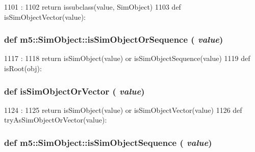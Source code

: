 \begin{DoxyCode}
1101                            :
1102     return issubclass(value, SimObject)
1103 
def isSimObjectVector(value):
\end{DoxyCode}
\hypertarget{namespacem5_1_1SimObject_a9bb31e7752bd7ccec0041220fb4c5ac7}{
\subsubsection[{isSimObjectOrSequence}]{\setlength{\rightskip}{0pt plus 5cm}def m5::SimObject::isSimObjectOrSequence ( {\em value})}}
\label{namespacem5_1_1SimObject_a9bb31e7752bd7ccec0041220fb4c5ac7}



\begin{DoxyCode}
1117                                 :
1118     return isSimObject(value) or isSimObjectSequence(value)
1119 
def isRoot(obj):
\end{DoxyCode}
\hypertarget{namespacem5_1_1SimObject_a1679f62df3bf4fec72ee979c969a01ac}{
\subsubsection[{isSimObjectOrVector}]{\setlength{\rightskip}{0pt plus 5cm}def isSimObjectOrVector ( {\em value})}}
\label{namespacem5_1_1SimObject_a1679f62df3bf4fec72ee979c969a01ac}



\begin{DoxyCode}
1124                               :
1125     return isSimObject(value) or isSimObjectVector(value)
1126 
def tryAsSimObjectOrVector(value):
\end{DoxyCode}
\hypertarget{namespacem5_1_1SimObject_a4acc81c2282827ef98653148d9c8f2a2}{
\subsubsection[{isSimObjectSequence}]{\setlength{\rightskip}{0pt plus 5cm}def m5::SimObject::isSimObjectSequence ( {\em value})}}
\label{namespacem5_1_1SimObject_a4acc81c2282827ef98653148d9c8f2a2}



